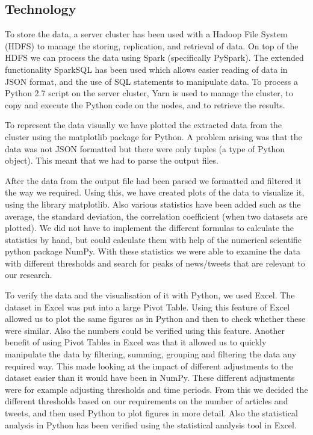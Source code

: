 \documentclass[paper=a4, fontsize=9px]{scrartcl} %
\numberwithin{equation}{section} %
\numberwithin{figure}{section} %
\numberwithin{table}{section} %
\begin{document}
\begin{multicols}{2}
\subsection{Technology}\label{sec:technology}

To store the data, a server cluster has been used with a Hadoop File System (HDFS) to manage the storing, replication, and retrieval of data. On top of the HDFS we can process the data using Spark (specifically PySpark). The extended functionality SparkSQL has been used which allows easier reading of data in JSON format, and the use of SQL statements to manipulate data. 
To process a Python 2.7 script on the server cluster, Yarn is used to manage the cluster, to copy and execute the Python code on the nodes, and to retrieve the results. 

To represent the data visually we have plotted the extracted data from the cluster using the matplotlib package for Python. A problem arising was that the data was not JSON formatted but there were only tuples (a type of Python object).  This meant that we had to parse the output files.

After the data from the output file had been parsed we formatted and filtered it the way we required. Using this, we have created plots of the data to visualize it, using the library matplotlib. Also various statistics have been added such as the average, the standard deviation, the correlation coefficient (when two datasets are plotted). We did not have to implement the different formulas to calculate the statistics by hand, but could calculate them with help of the numerical scientific python package NumPy. With these statistics we were able to examine the data with different thresholds and search for peaks of news/tweets that are relevant to our research.

To verify the data and the visualisation of it with Python, we used Excel. The dataset in Excel was put into a large Pivot Table. Using this feature of Excel allowed us to plot the same figures as in Python and then to check whether these were similar. Also the numbers could be verified using this feature. 
Another benefit of using Pivot Tables in Excel was that it allowed us to quickly manipulate the data by filtering, summing, grouping and filtering the data any required way. This made looking at the impact of different adjustments to the dataset easier than it would have been in NumPy. These different adjustments were for example adjusting thresholds and time periods. From this we decided the different thresholds based on our requirements on the number of articles and tweets, and then used Python to plot figures in more detail. Also the statistical analysis in Python has been verified using the statistical analysis tool in Excel.




\end{multicols}
\end{document}
